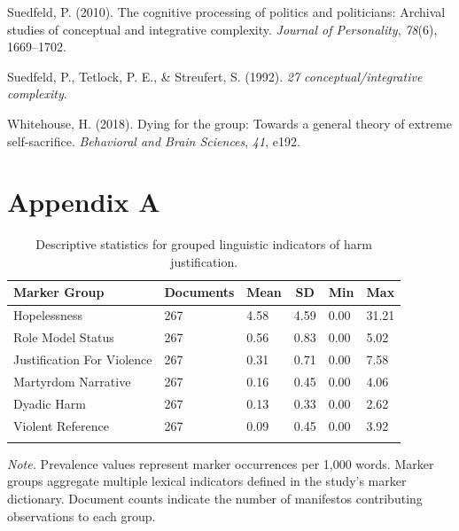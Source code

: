 \documentclass[
  english,
  man,floatsintext]{apa6}
\newlength{\cslhangindent}
\newenvironment{CSLReferences}[2] %
 {\begin{list}{}{%
  \setlength{\itemindent}{0pt}
  \setlength{\leftmargin}{0pt}
  \setlength{\parsep}{0pt}
  \ifodd #1
   \setlength{\leftmargin}{\cslhangindent}
   \setlength{\itemindent}{-1\cslhangindent}
  \fi
  \setlength{\itemsep}{#2\baselineskip}}}
 {\end{list}}
\begin{document}
\begin{CSLReferences}{1}{0}
Suedfeld, P. (2010). The cognitive processing of politics and politicians: Archival studies of conceptual and integrative complexity. \emph{Journal of Personality}, \emph{78}(6), 1669--1702.

Suedfeld, P., Tetlock, P. E., \& Streufert, S. (1992). \emph{27 conceptual/integrative complexity}.

Whitehouse, H. (2018). Dying for the group: Towards a general theory of extreme self-sacrifice. \emph{Behavioral and Brain Sciences}, \emph{41}, e192.

\end{CSLReferences}

\newpage

\clearpage

\section{Appendix A}\label{appendix-a}

\begin{table}[H]

\begin{center}
\begin{threeparttable}

\caption{\label{tab:group-descriptives}Descriptive statistics for grouped linguistic indicators of harm justification.}

\begin{tabular}{llllll}
\toprule
Marker Group & \multicolumn{1}{c}{Documents} & \multicolumn{1}{c}{Mean} & \multicolumn{1}{c}{SD} & \multicolumn{1}{c}{Min} & \multicolumn{1}{c}{Max}\\
\midrule
Hopelessness & 267 & 4.58 & 4.59 & 0.00 & 31.21\\
Role Model Status & 267 & 0.56 & 0.83 & 0.00 & 5.02\\
Justification For Violence & 267 & 0.31 & 0.71 & 0.00 & 7.58\\
Martyrdom Narrative & 267 & 0.16 & 0.45 & 0.00 & 4.06\\
Dyadic Harm & 267 & 0.13 & 0.33 & 0.00 & 2.62\\
Violent Reference & 267 & 0.09 & 0.45 & 0.00 & 3.92\\
\bottomrule
\addlinespace
\end{tabular}

\begin{tablenotes}[para]
\normalsize{\textit{Note.} Prevalence values represent marker occurrences per 1,000 words. Marker groups aggregate multiple lexical indicators defined in the study's marker dictionary. Document counts indicate the number of manifestos contributing observations to each group.}
\end{tablenotes}

\end{threeparttable}
\end{center}

\end{table}
\end{document}
